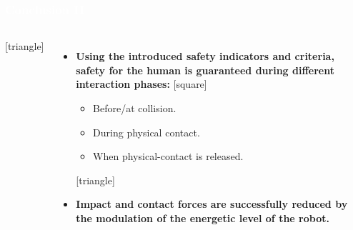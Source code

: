 \begin{frame}[noframenumbering]
\frametitle{{\textcolor{white}{\hspace{0.2cm}Conclusion II}}}
\begin{columns}
\column{\paperwidth-10mm}
[triangle]
\begin{itemize}
\item \textbf{Using the introduced safety indicators and criteria, {\color{red}safety for the human is guaranteed during different interaction phases}:  }
\setlength\itemsep{-0.5em}  
[square]
\begin{itemize}
\item Before/at collision.
\item During physical contact.
\item When physical-contact is released.
\end{itemize}
[triangle]
\setlength\itemsep{4mm}
\item \textbf{Impact and contact forces are successfully reduced by the modulation of the energetic level of the robot.}
\end{itemize}
\end{columns}
\end{frame}





